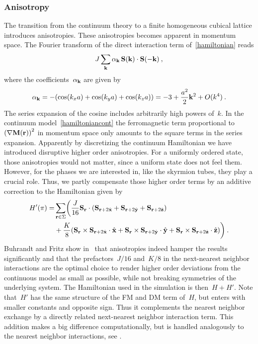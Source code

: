 \subsubsection{Anisotropy}

The transition from the continuum theory to a finite homogeneous cubical lattice
introduces anisotropies. These anisotropies becomes apparent in momentum space.
The Fourier transform of the direct interaction term of~\eqref{hamiltonian}
reads
%
\begin{equation}
  J \sum_{\mathbf{k}} \alpha_{\mathbf{k}}\, \mathbf{S} (\mathbf{k}) \cdot \mathbf{S} (- \mathbf{k}) \:,
\end{equation}
%
where the coefficients~$\alpha_{\mathbf{k}}$ are given by
%
\begin{equation}
  \alpha_{\mathbf{k}} = - (\cos (k_x a) + \cos (k_y a) + \cos (k_z a) ) =
  -3 + \frac{a^2}{2} \mathbf{k}^2 + O(k^4) \:.
\end{equation}
%
The series expansion of the cosine includes arbitrarily high powers of~$k$. In
the continuum model~\eqref{hamiltoniancont} the ferromagnetic term proportional
to~${( \nabla \mathbf{M} (\mathbf{r}) )}^2$ in momentum space only amounts to the square terms
in the series expansion. Apparently by discretizing the continuum Hamiltonian we
have introduced disruptive higher order anisotropies. For a uniformly ordered
state, those anisotropies would not matter, since a uniform state does not feel
them. However, for the phases we are interested in, like the skyrmion tubes,
they play a crucial role. Thus, we partly compensate those higher order terms
by an additive correction to the Hamiltonian given by
%
\begin{align}\label{hamiltonianfix}
  H'(\pi) = & \sum_{\mathbf{r} \in \Sigma} \biggl(
  \frac{J}{16} \mathbf{S}_{\mathbf{r}} \cdot (\mathbf{S}_{\mathbf{r}+2\hat{\mathbf{x}}} + \mathbf{S}_{\mathbf{r}+2\hat{\mathbf{y}}} + \mathbf{S}_{\mathbf{r}+2\hat{\mathbf{z}}})\nonumber \\
  &+ \frac{K}{8} (\mathbf{S}_{\mathbf{r}} \times \mathbf{S}_{\mathbf{r}+2\hat{\mathbf{x}}} \cdot \hat{\mathbf{x}} +
        \mathbf{S}_{\mathbf{r}} \times \mathbf{S}_{\mathbf{r}+2\hat{\mathbf{y}}} \cdot \hat{\mathbf{y}} +
        \mathbf{S}_{\mathbf{r}} \times \mathbf{S}_{\mathbf{r}+2\hat{\mathbf{z}}} \cdot \hat{\mathbf{z}})\biggr)\:.
\end{align}
%
Buhrandt and Fritz show in~\cite{skyrmion} that anisotropies indeed hamper the
results significantly and that the prefactors~$J/16$ and~$K/8$ in the
next-nearest neighbor interactions are the optimal choice to render higher order
deviations from the continuous model as small as possible, while not breaking
symmetries of the underlying system. The Hamiltonian used in the simulation is
then~$H + H'$. Note that~$H'$ has the same structure of the FM and DM term
of~$H$, but enters with smaller constants and opposite sign. Thus it complements
the nearest neighbor exchange by a directly related next-nearest neighbor
interaction term. This addition makes a big difference computationally, but is
handled analogously to the nearest neighbor interactions, see
.

